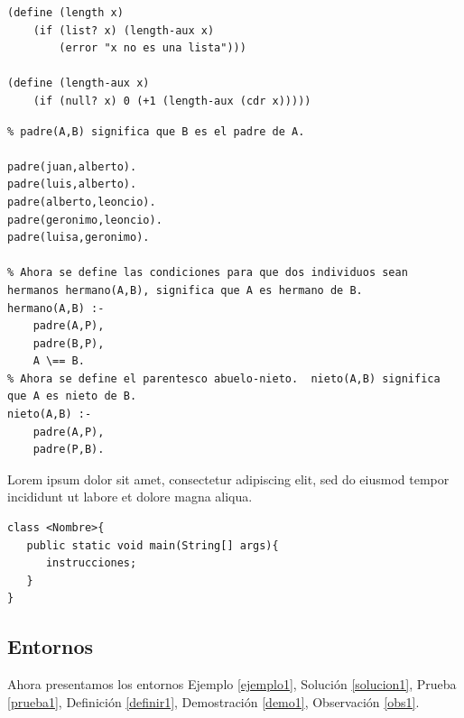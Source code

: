\lstset{language=LISP}
\begin{lstlisting}[caption= C\'odigo LISP de una Lista, label = codL]
(define (length x)
    (if (list? x) (length-aux x)
        (error "x no es una lista")))

(define (length-aux x)
    (if (null? x) 0 (+1 (length-aux (cdr x)))))
\end{lstlisting}




\lstset{language=PROLOG}
\begin{lstlisting}[caption= C\'odigo PROLOG de un \'arbol geneal\'ogico, label=codP]
% Arbol genealogico version 1.
% padre(A,B) significa que B es el padre de A.

padre(juan,alberto).
padre(luis,alberto).
padre(alberto,leoncio).
padre(geronimo,leoncio).
padre(luisa,geronimo).

% Ahora se define las condiciones para que dos individuos sean hermanos hermano(A,B), significa que A es hermano de B.
hermano(A,B) :-
    padre(A,P),
    padre(B,P),
    A \== B.
% Ahora se define el parentesco abuelo-nieto.  nieto(A,B) significa que A es nieto de B.
nieto(A,B) :-
    padre(A,P),
    padre(P,B).
\end{lstlisting}

Lorem ipsum dolor sit amet, consectetur adipiscing elit, sed do eiusmod tempor incididunt ut labore et dolore magna aliqua.

   \lstset{language=java}
\begin{lstlisting}[caption= C\'odigo JAVA de una clase, label=codj]
class <Nombre>{
   public static void main(String[] args){
      instrucciones;
   }
}
\end{lstlisting}








\subsection{Entornos}
Ahora presentamos los entornos Ejemplo \ref{ejemplo1}, Solución \ref{solucion1}, Prueba \ref{prueba1}, Definición \ref{definir1}, Demostración \ref{demo1}, Observación \ref{obs1}.

\begin{ejemplo}\label{ejemplo1}
\lipsum[1] %
\end{ejemplo}

\begin{solucion}\label{solucion1}
\lipsum[1] %
\end{solucion}

